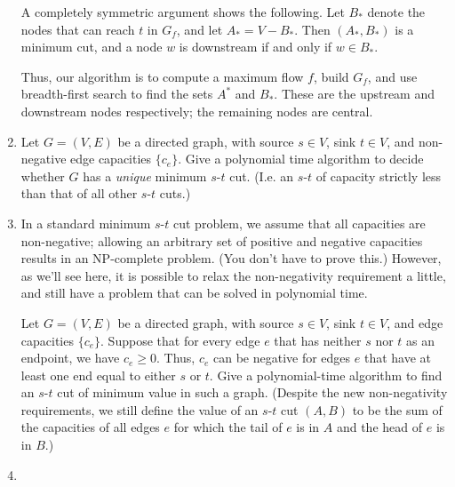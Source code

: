 \documentclass[12pt]{article}
\begin{document}
\begin{enumerate}
{A completely symmetric argument shows the following.
Let $B_*$ denote the nodes that can reach $t$ in $G_f$,
and let $A_* = V - B_*$.
Then $(A_*, B_*)$ is a minimum cut, and a node
$w$ is downstream if and only if $w \in B_*$.

Thus, our algorithm is to compute a maximum flow $f$,
build $G_f$, and use breadth-first search to find the
sets $A^*$ and $B_*$.
These are the upstream and downstream nodes respectively;
the remaining nodes are central.

}



\item

Let $G = (V,E)$ be a directed graph, with
source $s \in V$, sink $t \in V$,
and non-negative edge capacities $\{c_e\}$.
Give a polynomial time algorithm to decide whether
$G$ has a {\em unique} minimum $s$-$t$ cut.
(I.e. an $s$-$t$ of capacity strictly less
than that of all other $s$-$t$ cuts.)



\item

In a standard minimum $s$-$t$ cut problem, we assume
that all capacities are non-negative;
allowing an arbitrary set of positive and negative
capacities results in an NP-complete problem.
(You don't have to prove this.)
However, as we'll see here,
it is possible to relax the non-negativity
requirement a little, and still have a problem
that can be solved in polynomial time.

Let $G = (V,E)$ be a directed graph, with
source $s \in V$, sink $t \in V$,
and edge capacities $\{c_e\}$.
Suppose that for every edge $e$ that has neither
$s$ nor $t$ as an endpoint, we have $c_e \geq 0$.
Thus, $c_e$ can be negative for edges $e$ that have
at least one end equal to either $s$ or $t$.
Give a polynomial-time algorithm to find an
$s$-$t$ cut of minimum value in such a graph.
(Despite the new non-negativity requirements,
we still define the value of an $s$-$t$ cut $(A,B)$
to be the sum of the capacities of all edges $e$
for which the tail of $e$ is in $A$ and the head
of $e$ is in $B$.)






\item


\end{enumerate}
\end{document}
